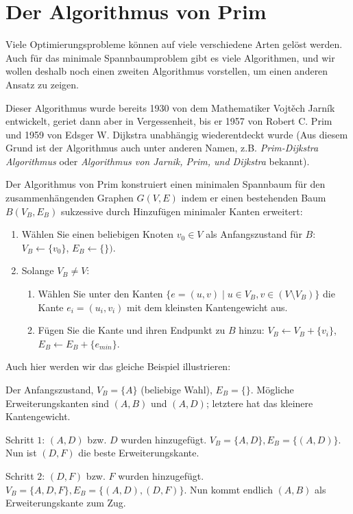 \documentclass[12pt,a4paper]{report}
\theoremstyle{break}
\theoremstyle{plain}
\newcommand{\algostep}[2]{\parbox{4cm}{\scalebox{0.5}{\texttt{[image: \#1]}}}
  \hfill
  \parbox{7cm}{#2}
}
\begin{document}
\section{Der Algorithmus von Prim}

Viele Optimierungsprobleme k\"{o}nnen auf viele verschiedene Arten
gel\"{o}st werden. Auch f\"{u}r das minimale Spannbaumproblem gibt es
viele Algorithmen, und wir wollen deshalb noch einen zweiten
Algorithmus vorstellen, um einen anderen Ansatz zu zeigen.

Dieser Algorithmus wurde bereits 1930 von dem Mathematiker
Vojt\v{e}ch Jarn\'ik entwickelt, geriet dann aber in Vergessenheit,
bis er 1957 von Robert C. Prim und 1959 von Edsger W. Dijkstra
unabh\"{a}ngig wiederentdeckt wurde (Aus diesem Grund ist der
Algorithmus auch unter anderen Namen, z.B. \emph{Prim-Dijkstra
  Algorithmus} oder \emph{Algorithmus von Jarnik, Prim, und Dijkstra}
bekannt).

Der Algorithmus von Prim konstruiert einen minimalen Spannbaum f\"{u}r
den zusammenh\"{a}ngenden Graphen $G(V,E)$ indem er einen bestehenden Baum $B(V_B,E_B)$
sukzessive durch Hinzuf\"{u}gen minimaler Kanten erweitert:

\begin{enumerate}
\item W\"{a}hlen Sie einen beliebigen Knoten $v_0\in V$ als
  Anfangszustand f\"{u}r $B$: $V_B \gets \{v_0\}$, $E_B \gets \{\})$.
\item Solange $V_B\neq V$:
\begin{enumerate}
\item W\"{a}hlen Sie unter den Kanten $\{e = (u,v)\mid u\in V_B, v\in
  (V\!\setminus\!V_B)\}$ die Kante $e_i= (u_i,v_i)$ mit dem kleinsten
Kantengewicht aus.
\item F\"{u}gen Sie die Kante und ihren Endpunkt zu $B$ hinzu: $V_B \gets
  V_B+\{v_i\}$, $E_B \gets E_B+\{e_{min}\}$.
\end{enumerate}
\end{enumerate}

\newpage
Auch hier werden wir das gleiche Beispiel illustrieren:

\algostep{DemoPrim1.pdf}{Der Anfangszustand, $V_B = \{A\}$ (beliebige
  Wahl), $E_B = \{\}$. M\"{o}gliche Erweiterungskanten sind $(A,B)$
  und $(A,D)$; letztere hat das kleinere Kantengewicht.}
\algostep{DemoPrim2.pdf}{Schritt $1$: $(A,D)$ bzw. $D$ wurden
  hinzugef\"{u}gt. $V_B = \{A,D\}, E_B=\{(A,D)\}$. Nun ist $(D,F)$ die
  beste Erweiterungskante.}
\algostep{DemoPrim3.pdf}{Schritt $2$: $(D,F)$ bzw. $F$ wurden 
 hinzugef\"{u}gt. $V_B = \{A,D,F\}, E_B=\{(A,D), (D,F)\}$. Nun kommt
 endlich $(A,B)$ als Erweiterungskante zum Zug.}
\end{document}
